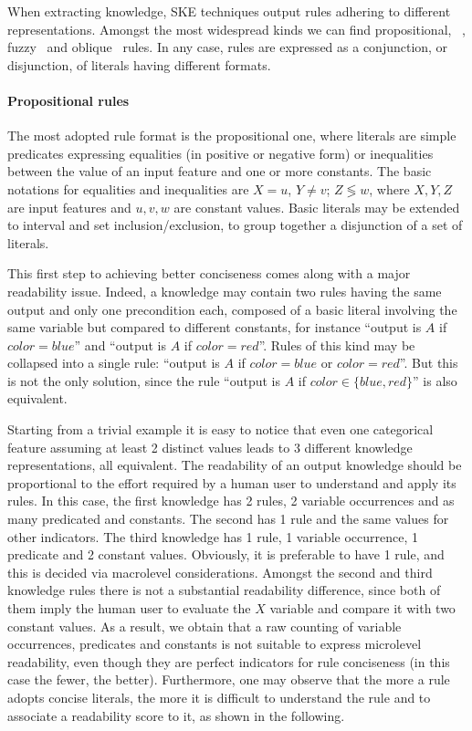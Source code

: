 \documentclass[sigconf]{acmart}
\begin{document}
When extracting knowledge, SKE techniques output rules adhering to different representations.
%
Amongst the most widespread kinds we can find propositional, \mofn{}~\cite{TowellS91,murphy1991id2}, fuzzy~\cite{HorikawaFU92,Berenji91} and oblique~\cite{Setiono00,SetionoL97} rules.
%
In any case, rules are expressed as a conjunction, or disjunction, of literals having different formats.

\paragraph{Propositional rules}

The most adopted rule format is the propositional one, where literals are simple predicates expressing equalities (in positive or negative form) or inequalities between the value of an input feature and one or more constants.
%
The basic notations for equalities and inequalities are $X = u$, $Y \neq v$; $Z \lessgtr w$, where $X,Y,Z$ are input features and $u,v,w$ are constant values.
%
Basic literals may be extended to interval and set inclusion/exclusion, to group together a disjunction of a set of literals.

This first step to achieving better conciseness comes along with a major readability issue.
%
Indeed, a knowledge may contain two rules having the same output and only one precondition each, composed of a basic literal involving the same variable but compared to different constants, for instance ``output is $A$ if $color=blue$'' and ``output is $A$ if $color=red$''.
%
Rules of this kind may be collapsed into a single rule: ``output is $A$ if $color=blue$ or $color=red$''.
%
But this is not the only solution, since the rule ``output is $A$ if $color \in \{blue,red\}$'' is also equivalent.

Starting from a trivial example it is easy to notice that even one categorical feature assuming at least 2 distinct values leads to 3 different knowledge representations, all equivalent.
%
The readability of an output knowledge should be proportional to the effort required by a human user to understand and apply its rules.
%
In this case, the first knowledge has 2 rules, 2 variable occurrences and as many predicated and constants.
%
The second has 1 rule and the same values for other indicators.
%
The third knowledge has 1 rule, 1 variable occurrence, 1 predicate and 2 constant values.
%
Obviously, it is preferable to have 1 rule, and this is decided via macrolevel considerations.
%
Amongst the second and third knowledge rules there is not a substantial readability difference, since both of them imply the human user to evaluate the $X$ variable and compare it with two constant values.
%
As a result, we obtain that a raw counting of variable occurrences, predicates and constants is not suitable to express microlevel readability, even though they are perfect indicators for rule conciseness (in this case the fewer, the better).
%
Furthermore, one may observe that the more a rule adopts concise literals, the more it is difficult to understand the rule and to associate a readability score to it, as shown in the following.
\end{document}
